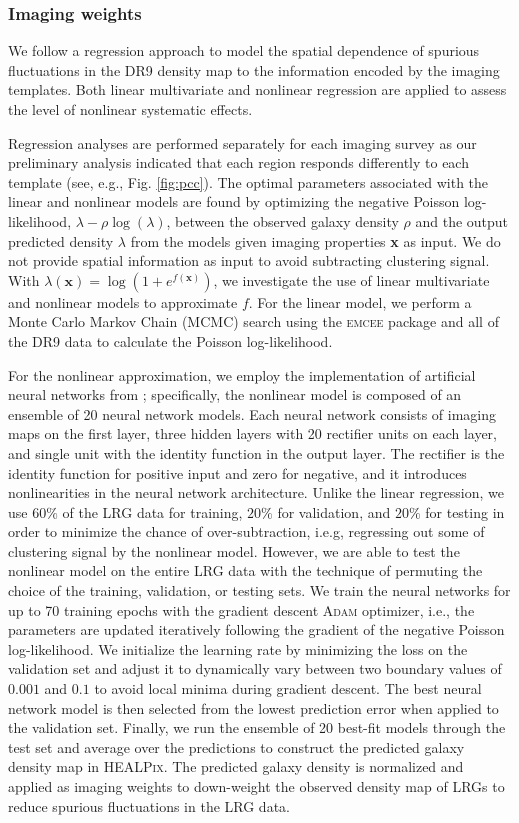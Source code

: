 \subsubsection{Imaging weights}
We follow a regression approach to model the spatial dependence of spurious fluctuations in the DR9 density map to the information encoded by the imaging templates. Both linear multivariate and nonlinear regression are applied to assess the level of nonlinear systematic effects. 

Regression analyses are performed separately for each imaging survey as our preliminary analysis indicated that each region responds differently to each template (see, e.g., Fig. \ref{fig:pcc}). The optimal parameters associated with the linear and nonlinear models are found by optimizing the negative Poisson log-likelihood, $\lambda - \rho \log(\lambda)$, between the observed galaxy density $\rho$ and the output predicted density $\lambda$ from the models given imaging properties \textbf{x} as input. We do not provide spatial information as input to avoid subtracting clustering signal. With $\lambda(\textbf{x}) = \log (1+e^{f(\textbf{x})})$, we investigate the use of linear multivariate and nonlinear models to approximate $f$. For the linear model, we perform a Monte Carlo Markov Chain (MCMC) search using the \textsc{emcee} package \citep{2013PASP..125..306F} and all of the DR9 data to calculate the Poisson log-likelihood. 

For the nonlinear approximation, we employ the implementation of artificial neural networks from \cite{rezaie2021primordial}; specifically, the nonlinear model is composed of an ensemble of 20 neural network models. Each neural network consists of imaging maps on the first layer, three hidden layers with 20 rectifier units on each layer, and single unit with the identity function in the output layer. The rectifier is the identity function for positive input and zero for negative, and it introduces nonlinearities in the neural network architecture. Unlike the linear regression, we use $60\%$ of the LRG data for training, $20\%$ for validation, and $20\%$ for testing in order to minimize the chance of over-subtraction, i.e.g, regressing out some of clustering signal by the nonlinear model. However, we are able to test the nonlinear model on the entire LRG data with the technique of permuting the choice of the training, validation, or testing sets. We train the neural networks for up to 70 training epochs with the gradient descent \textsc{Adam} optimizer, i.e., the parameters are updated iteratively following the gradient of the negative Poisson log-likelihood. We initialize the learning rate by minimizing the loss on the validation set and adjust it to dynamically vary between two boundary values of $0.001$ and $0.1$ to avoid local minima during gradient descent. The best neural network model is then selected from the lowest prediction error when applied to the validation set. Finally, we run the ensemble of 20 best-fit models through the test set and average over the predictions to construct the predicted galaxy density map in \textsc{HEALPix}. The predicted galaxy density is normalized and applied as imaging weights to down-weight the observed density map of LRGs to reduce spurious fluctuations in the LRG data. 

